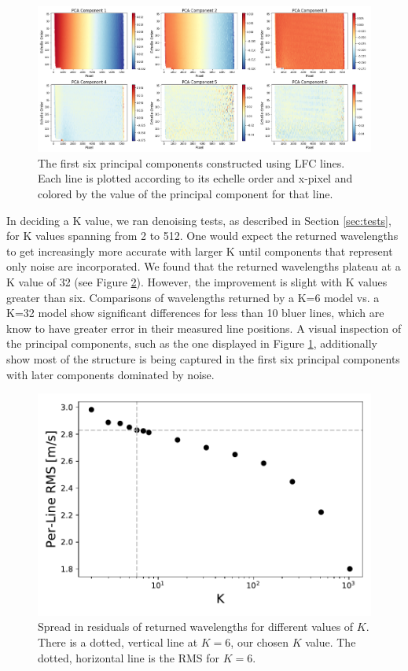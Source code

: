 \documentclass[modern]{aastex63}
\begin{document}
\begin{figure}[t]
\centering
\includegraphics[width=\textwidth]{Figures/pcsLfc6.png}
\caption{The first six principal components constructed using LFC lines.  Each line is plotted according to its echelle order and x-pixel and colored by the value of the principal component for that line.}
\label{fig:pcLfc}
\end{figure}

In deciding a K value, we ran denoising tests, as described in Section \ref{sec:tests}, for K values spanning from 2 to 512.  One would expect the returned wavelengths to get increasingly more accurate with larger K until components that represent only noise are incorporated.  We found that the returned wavelengths plateau at a K value of 32 (see Figure \ref{fig:kvals}).  However, the improvement is slight with K values greater than six.  Comparisons of wavelengths returned by a K=6 model vs. a K=32 model show significant differences for less than 10 bluer lines, which are know to have greater error in their measured line positions.  A visual inspection of the principal components, such as the one displayed in Figure \ref{fig:pcLfc}, additionally show most of the structure is being captured in the first six principal components with later components dominated by noise.


\begin{figure}[t]
\centering
\includegraphics[width=.5\textwidth]{Figures/kvals_all.pdf}
\caption{Spread in residuals of returned wavelengths for different values of $K$.  There is a dotted, vertical line at $K=6$, our chosen $K$ value.  The dotted, horizontal line is the RMS for $K=6$.}
\label{fig:kvals}
\end{figure}
\end{document}
